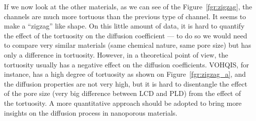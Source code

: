 \documentclass[main]{subfiles}
\begin{document}
If we now look at the other materials, as we can see of the Figure~\ref{fgr:zigzag}, the channels are much more tortuous than the previous type of channel. It seems to make a ``zigzag'' like shape. On this little amount of data, it is hard to quantify the effect of the tortuosity on the diffusion coefficient --- to do so we would need to compare very similar materials (same chemical nature, same pore size) but has only a difference in tortuosity. However, in a theoretical point of view, the tortuosity usually has a negative effect on the diffusion coefficients. VOHQIS, for instance, has a high degree of tortuosity as shown on Figure~\ref{fgr:zigzag_a}, and the diffusion properties are not very high, but it is hard to disentangle the effect of the pore size (very big difference between LCD and PLD) from the effect of the tortuosity. A more quantitative approach should be adopted to bring more insights on the diffusion process in nanoporous materials. 
\end{document}
